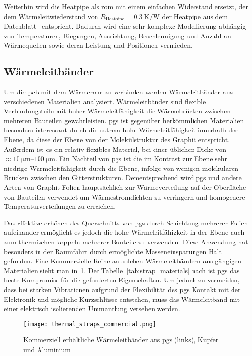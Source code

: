 Weiterhin wird die Heatpipe als \ac{rom} mit einem einfachen Widerstand ersetzt, der dem Wärmeleitwiederstand von $R_\mathrm{Heatpipe} = \SI{0,3}{\kelvin\per\watt}$ der Heatpipe aus dem Datenblatt~\cite{QuickOhm-Heatpipe-5x400} entspricht.
Dadurch wird eine sehr komplexe Modellierung abhängig von Temperaturen, Biegungen, Ausrichtung, Beschleunigung und Anzahl an Wärmequellen sowie deren Leistung und Positionen vermieden.

\subsection{Wärmeleitbänder}\label{sec:waermebaender}

Um die \ac{pcb} mit dem Wärmerohr zu verbinden werden Wärmeleitbänder aus verschiedenen Materialien analysiert.
Wärmeleitbänder sind flexible Verbindungsteile mit hoher Wärmeleitfähigkeit die Wärmebrücken zwischen mehreren Bauteilen gewährleisten.
\ac{pgs} ist gegenüber herkömmlichen Materialien besonders interessant durch die extrem hohe Wärmeleitfähigkeit innerhalb der Ebene,
da diese der Ebene von der Molekülstruktur des Graphit entspricht. Außerdem ist es ein relativ flexibles Material, bei einer üblichen Dicke von $\approx \SIrange{10}{100}{\micro\meter}$.
Ein Nachteil von \ac{pgs} ist die im Kontrast zur Ebene sehr niedrige Wärmeleitfähigkeit durch die Ebene, infolge von wenigen
molekularen Brücken zwischen den Gitterstrukturen. Dementsprechend wird \ac{pgs} und andere Arten von Graphit Folien hauptsächlich zur
Wärmeverteilung auf der Oberfläche von Bauteilen verwendet um Wärmestromdichten zu verringern und homogenere Temperaturverteilungen zu erreichen.

Das effektive erhöhen des Querschnitts von \ac{pgs} durch Schichtung mehrerer Folien aufeinander ermöglicht es jedoch die hohe
Wärmeleitfähigkeit in der Ebene auch zum thermischen koppeln mehrerer Bauteile zu verwenden. Diese Anwendung hat besonders in der 
Raumfahrt durch ermöglichte Masseneinsparungen Halt gefunden. Eine Kommerzielle Reihe an solchen Wärmeleitbändern aus gängigen Materialien sieht man in~\ref{fig:thermalstraps_commercial}.
Der Tabelle~\ref{tab:strap_materials} nach ist \ac{pgs} das beste Kompromiss für die geforderten Eigenschaften. Um jedoch zu vermeiden, dass
bei starken Vibrationen aufgrund der Flexibilität des \ac{pgs} Kontakt mit der Elektronik und mögliche Kurzschlüsse entstehen, muss das Wärmeleitband mit einer elektrisch
isolierenden Ummantlung versehen werden.

\begin{figure}
  \centering
  \texttt{[image: thermal\_straps\_commercial.png]}
  \caption{Kommerziell erhältliche Wärmeleitbänder aus \ac{pgs} (links), Kupfer und Aluminium~\cite{Thermal-Straps}}\label{fig:thermalstraps_commercial}
\end{figure}

